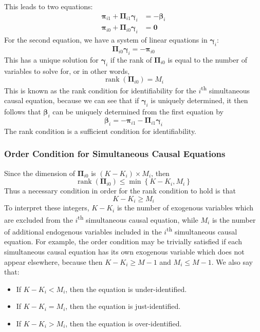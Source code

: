 \documentclass[11pt]{report} %
\begin{document}
This leads to two equations:
\begin{align}
\boldsymbol{\pi}_{i1} + \boldsymbol{\Pi}_{i1}\boldsymbol{\gamma}_{i} &= - \boldsymbol{\beta}_{i}  \\
\boldsymbol{\pi}_{i0} + \boldsymbol{\Pi}_{i0} \boldsymbol{\gamma}_{i} &= \mathbf{0}
\end{align}
For the second equation, we have a system of linear equations in $\boldsymbol{\gamma}_{i}$:
\begin{equation}
 \boldsymbol{\Pi}_{i0} \boldsymbol{\gamma}_{i} = -\boldsymbol{\pi}_{i0}
\end{equation}
This has a unique solution for $\boldsymbol{\gamma}_{i}$ if the rank of $\boldsymbol{\Pi}_{i0}$ is equal to the number of variables to solve for, or in other words,
\begin{equation}
\operatorname{rank}\left(\boldsymbol{\Pi}_{i0}\right) = M_{i}
\end{equation}
This is known as the rank condition for identifiability for the $i$\textsuperscript{th} simultaneous causal equation, because we can see that if $\boldsymbol{\gamma}_{i}$ is uniquely determined, it then follows that $\boldsymbol{\beta}_{i}$ can be uniquely determined from the first equation by
\begin{equation}
\boldsymbol{\beta}_{i} = -\boldsymbol{\pi}_{i1} - \boldsymbol{\Pi}_{i1}\boldsymbol{\gamma}_{i}
\end{equation}
The rank condition is a sufficient condition for identifiability.

\subsubsection{Order Condition for Simultaneous Causal Equations \cite{Amemiya1985}}

Since the dimension of $\boldsymbol{\Pi}_{i0}$ is $\left(K - K_{i}\right)\times M_{i}$, then
\begin{equation}
\operatorname{rank}\left(\boldsymbol{\Pi}_{i0}\right) \leq \min\left\{K - K_{i}, M_{i}\right\}
\end{equation}
Thus a necessary condition in order for the rank condition to hold is that
\begin{equation}
K - K_{i} \geq M_{i}
\end{equation}
To interpret these integers, $K - K_{i}$ is the number of exogenous variables which are excluded from the $i$\textsuperscript{th} simultaneous causal equation, while $M_{i}$ is the number of additional endogenous variables included in the $i$\textsuperscript{th} simultaneous causal equation. For example, the order condition may be trivially satisfied if each simultaneous causal equation has its own exogenous variable which does not appear elsewhere, because then $K - K_{i} \geq M - 1$ and $M_{i} \leq M - 1$. We also say that:
\begin{itemize}
\item If $K - K_{i} < M_{i}$, then the equation is under-identified.
\item If $K - K_{i} = M_{i}$, then the equation is just-identified.
\item If $K - K_{i} > M_{i}$, then the equation is over-identified.
\end{itemize}
\end{document}
